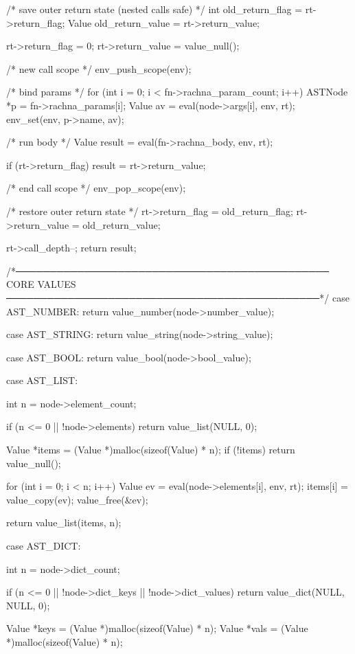 \documentclass{article}
\begin{document}
{{{    /* save outer return state (nested calls safe) */
    int old_return_flag = rt->return_flag;
    Value old_return_value = rt->return_value;

    rt->return_flag = 0;
    rt->return_value = value_null();

    /* new call scope */
    env_push_scope(env);

    /* bind params */
       for (int i = 0; i < fn->rachna_param_count; i++) {
    ASTNode *p = fn->rachna_params[i];
        Value av = eval(node->args[i], env, rt);
        env_set(env, p->name, av);
    }

    /* run body */
    Value result = eval(fn->rachna_body, env, rt);

    if (rt->return_flag)
        result = rt->return_value;

    /* end call scope */
    env_pop_scope(env);

    /* restore outer return state */
    rt->return_flag = old_return_flag;
    rt->return_value = old_return_value;

   rt->call_depth--;
    return result;
}

/*──────────────────────────────────────────────
      CORE VALUES
    ──────────────────────────────────────────────*/
case AST_NUMBER:
    return value_number(node->number_value);

case AST_STRING:
    return value_string(node->string_value);

case AST_BOOL:
    return value_bool(node->bool_value);



    case AST_LIST: {
        int n = node->element_count;

        if (n <= 0 || !node->elements) {
            return value_list(NULL, 0);
        }

        Value *items = (Value *)malloc(sizeof(Value) * n);
        if (!items) return value_null();

        for (int i = 0; i < n; i++) {
            Value ev = eval(node->elements[i], env, rt);
            items[i] = value_copy(ev);
            value_free(&ev);
        }

        return value_list(items, n);
    }


case AST_DICT: {
        int n = node->dict_count;

        if (n <= 0 || !node->dict_keys || !node->dict_values) {
            return value_dict(NULL, NULL, 0);
        }

        Value *keys = (Value *)malloc(sizeof(Value) * n);
        Value *vals = (Value *)malloc(sizeof(Value) * n);

}}}
\end{document}
